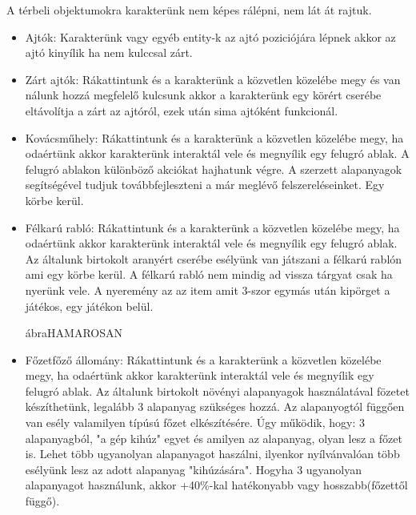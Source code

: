 A térbeli objektumokra karakterünk nem képes rálépni, nem lát át rajtuk.
\begin{itemize}
\item
Ajtók: Karakterünk vagy egyéb entity-k az ajtó poziciójára lépnek akkor az ajtó kinyílik ha nem kulccsal zárt.
\item
Zárt ajtók: Rákattintunk és a karakterünk a közvetlen közelébe megy és van nálunk hozzá megfelelő kulcsunk akkor a karakterünk egy körért cserébe eltávolítja a zárt az ajtóról, ezek után sima ajtóként funkcionál.
\item
Kovácsműhely: Rákattintunk és a karakterünk a közvetlen közelébe megy, ha odaértünk akkor karakterünk interaktál vele és megnyílik egy felugró ablak. A felugró ablakon különböző akciókat hajhatunk végre. A szerzett alapanyagok segítségével tudjuk továbbfejleszteni a már meglévő felszereléseinket. Egy körbe kerül.


\item
Félkarú rabló: Rákattintunk és a karakterünk a közvetlen közelébe megy, ha odaértünk akkor karakterünk interaktál vele és megnyílik egy felugró ablak. Az általunk birtokolt aranyért cserébe esélyünk van játszani a félkarú rablón ami egy körbe kerül. A félkarú rabló nem mindig ad vissza tárgyat csak ha nyerünk vele. A nyeremény az az item amit 3-szor egymás után kipörget a játékos, egy játékon belül.


ábra{HAMAROSAN}


\item
Főzetfőző állomány: Rákattintunk és a karakterünk a közvetlen közelébe megy, ha odaértünk akkor karakterünk interaktál vele és megnyílik egy felugró ablak. Az általunk birtokolt növényi alapanyagok használatával fözetet készíthetünk, legalább 3 alapanyag szükséges hozzá. Az alapanyogtól függően van esély valamilyen típúsú főzet elkészítésére. Úgy működik, hogy: 3 alapanyagból, "a gép kihúz" egyet és amilyen az alapanyag, olyan lesz a főzet is. Lehet több ugyanolyan alapanyagot haszálni, ilyenkor nyílvánvalóan több esélyünk lesz az adott alapanyag "kihúzására". Hogyha 3 ugyanolyan alapanyagot használunk, akkor +40\%-kal hatékonyabb vagy hosszabb(főzettől függő).


\end{itemize}
